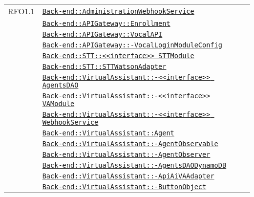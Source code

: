 \begin{longtable}{|>{\centering}m{3cm}|m{10cm}<{\centering}|}
RFO1.1 & \hyperref[Back-end::AdministrationWebhookService]{\texttt{Back-end::AdministrationWebhookService}}\\
& \hyperref[Back-end::APIGateway::Enrollment]{\texttt{Back-end::APIGateway::Enrollment}}\\
& \hyperref[Back-end::APIGateway::VocalAPI]{\texttt{Back-end::APIGateway::VocalAPI}}\\
& \hyperref[Back-end::APIGateway::VocalLoginModuleConfig]{\texttt{Back-end::APIGateway::-\linebreak VocalLoginModuleConfig}}\\
& \hyperref[Back-end::STT::<<interface>> STTModule]{\texttt{Back-end::STT::<<interface>> STTModule}}\\
& \hyperref[Back-end::STT::STTWatsonAdapter]{\texttt{Back-end::STT::STTWatsonAdapter}}\\
& \hyperref[Back-end::VirtualAssistant::<<interface>> AgentsDAO]{\texttt{Back-end::VirtualAssistant::-\linebreak <<interface>> AgentsDAO}}\\
& \hyperref[Back-end::VirtualAssistant::<<interface>> VAModule]{\texttt{Back-end::VirtualAssistant::-\linebreak <<interface>> VAModule}}\\
& \hyperref[Back-end::VirtualAssistant::<<interface>> WebhookService]{\texttt{Back-end::VirtualAssistant::-\linebreak <<interface>> WebhookService}}\\
& \hyperref[Back-end::VirtualAssistant::Agent]{\texttt{Back-end::VirtualAssistant::Agent}}\\
& \hyperref[Back-end::VirtualAssistant::AgentObservable]{\texttt{Back-end::VirtualAssistant::-\linebreak AgentObservable}}\\
& \hyperref[Back-end::VirtualAssistant::AgentObserver]{\texttt{Back-end::VirtualAssistant::-\linebreak AgentObserver}}\\
& \hyperref[Back-end::VirtualAssistant::AgentsDAODynamoDB]{\texttt{Back-end::VirtualAssistant::-\linebreak AgentsDAODynamoDB}}\\
& \hyperref[Back-end::VirtualAssistant::ApiAiVAAdapter]{\texttt{Back-end::VirtualAssistant::-\linebreak ApiAiVAAdapter}}\\
& \hyperref[Back-end::VirtualAssistant::ButtonObject]{\texttt{Back-end::VirtualAssistant::-\linebreak ButtonObject}}\\

\end{longtable}
